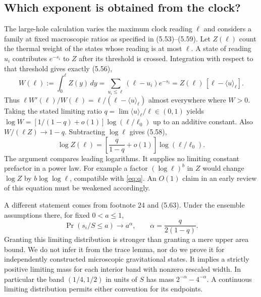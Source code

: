 \documentclass[11pt]{article}
\newcommand{\Prob}{\operatorname{Pr}}
\begin{document}
\subsection{Which exponent is obtained from the clock?}
The large-hole calculation varies the maximum clock reading $\ell$ and considers a family at fixed macroscopic ratios as specified in (5.53)--(5.59). Let $Z(\ell)$ count the thermal weight of the states whose reading is at most $\ell$. A state of reading $u_i$ contributes $e^{-s_i}$ to $Z$ after its threshold is crossed. Integration with respect to that threshold gives exactly (5.56),
\[
 W(\ell):=\int_0^\ell Z(y)\,dy
     =\sum_{u_i\le\ell}(\ell-u_i)e^{-s_i}
     =Z(\ell)\,[\ell-\langle u\rangle_\ell] .
\]
Thus $\ell W'(\ell)/W(\ell)=\ell/(\ell-\langle u\rangle_\ell)$ almost everywhere where $W>0$. Taking the stated limiting ratio $q=\lim\langle u\rangle_\ell/\ell\in(0,1)$ yields $\log W=[1/(1-q)+o(1)]\log(\ell/\ell_0)$ up to an additive constant. Also $W/(\ell Z)\to1-q$. Subtracting $\log\ell$ gives (5.58),
\begin{equation}\label{eq:q}
 \log Z(\ell)=\left[\frac{q}{1-q}+o(1)\right]\log(\ell/\ell_0).
\end{equation}
The argument compares leading logarithms. It supplies no limiting constant prefactor in a power law. For example a factor $(\log\ell)^b$ in $Z$ would change $\log Z$ by $b\log\log\ell$, compatible with \eqref{eq:q}. An $O(1)$ claim in an early review of this equation must be weakened accordingly.

A different statement comes from footnote 24 and (5.63). Under the ensemble assumptions there, for fixed $0<a\le1$,
\begin{equation}\label{eq:cdf}
 \Prob(s_i/S\le a)\longrightarrow a^\alpha,\qquad
 \alpha=\frac{q}{2(1-q)} .
\end{equation}
Granting this limiting distribution is stronger than granting a mere upper area bound. We do not infer it from the trace lemma, nor do we prove it for independently constructed microscopic gravitational states. It implies a strictly positive limiting mass for each interior band with nonzero rescaled width. In particular the band $(1/4,1/2)$ in units of $S$ has mass $2^{-\alpha}-4^{-\alpha}$. A continuous limiting distribution permits either convention for its endpoints.
\end{document}
